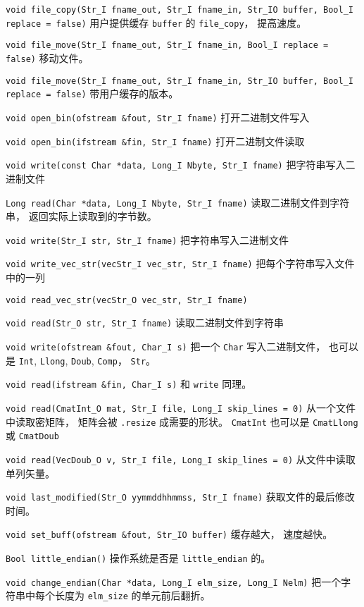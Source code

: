 \verb|void file_copy(Str_I fname_out, Str_I fname_in, Str_IO buffer, Bool_I replace = false)| 用户提供缓存 \verb|buffer| 的 \verb|file_copy|， 提高速度。

\verb|void file_move(Str_I fname_out, Str_I fname_in, Bool_I replace = false)| 移动文件。

\verb|void file_move(Str_I fname_out, Str_I fname_in, Str_IO buffer, Bool_I replace = false)| 带用户缓存的版本。

\verb|void open_bin(ofstream &fout, Str_I fname)| 打开二进制文件写入

\verb|void open_bin(ifstream &fin, Str_I fname)| 打开二进制文件读取

\verb|void write(const Char *data, Long_I Nbyte, Str_I fname)| 把字符串写入二进制文件

\verb|Long read(Char *data, Long_I Nbyte, Str_I fname)| 读取二进制文件到字符串， 返回实际上读取到的字节数。

\verb|void write(Str_I str, Str_I fname)| 把字符串写入二进制文件

\verb|void write_vec_str(vecStr_I vec_str, Str_I fname)| 把每个字符串写入文件中的一列

\verb|void read_vec_str(vecStr_O vec_str, Str_I fname)|

\verb|void read(Str_O str, Str_I fname)| 读取二进制文件到字符串

\verb|void write(ofstream &fout, Char_I s)| 把一个 \verb|Char| 写入二进制文件， 也可以是 \verb|Int|, \verb|Llong|, \verb|Doub|, \verb|Comp|， \verb|Str|。

\verb|void read(ifstream &fin, Char_I s)| 和 \verb|write| 同理。

\verb|void read(CmatInt_O mat, Str_I file, Long_I skip_lines = 0)| 从一个文件中读取密矩阵， 矩阵会被 \verb|.resize| 成需要的形状。 \verb|CmatInt| 也可以是 \verb|CmatLlong| 或 \verb|CmatDoub|

\verb|void read(VecDoub_O v, Str_I file, Long_I skip_lines = 0)| 从文件中读取单列矢量。

\verb|void last_modified(Str_O yymmddhhmmss, Str_I fname)| 获取文件的最后修改时间。

\verb|void set_buff(ofstream &fout, Str_IO buffer)| 缓存越大， 速度越快。

\verb|Bool little_endian()| 操作系统是否是 \verb|little_endian| 的。

\verb|void change_endian(Char *data, Long_I elm_size, Long_I Nelm)| 把一个字符串中每个长度为 \verb|elm_size| 的单元前后翻折。
